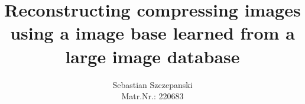 \title{Reconstructing compressing images using a image base learned from a large image database}
\author{Sebastian Szczepanski \\ Matr.Nr.: 220683}
\maketitle